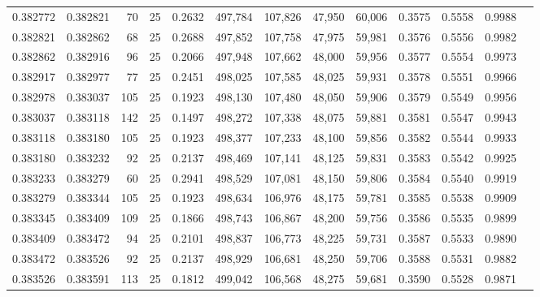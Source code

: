 \begin{tabular}{rrrrrrrrrrrrr}
0.382772 & 0.382821 &    70 &  25 &                                     0.2632 & 497,784 & 107,826 &  47,950 &  60,006 & 0.3575 & 0.5558 & 0.9988 \\
0.382821 & 0.382862 &    68 &  25 &                                     0.2688 & 497,852 & 107,758 &  47,975 &  59,981 & 0.3576 & 0.5556 & 0.9982 \\
0.382862 & 0.382916 &    96 &  25 &                                     0.2066 & 497,948 & 107,662 &  48,000 &  59,956 & 0.3577 & 0.5554 & 0.9973 \\
0.382917 & 0.382977 &    77 &  25 &                                     0.2451 & 498,025 & 107,585 &  48,025 &  59,931 & 0.3578 & 0.5551 & 0.9966 \\
0.382978 & 0.383037 &   105 &  25 &                                     0.1923 & 498,130 & 107,480 &  48,050 &  59,906 & 0.3579 & 0.5549 & 0.9956 \\
0.383037 & 0.383118 &   142 &  25 &                                     0.1497 & 498,272 & 107,338 &  48,075 &  59,881 & 0.3581 & 0.5547 & 0.9943 \\
0.383118 & 0.383180 &   105 &  25 &                                     0.1923 & 498,377 & 107,233 &  48,100 &  59,856 & 0.3582 & 0.5544 & 0.9933 \\
0.383180 & 0.383232 &    92 &  25 &                                     0.2137 & 498,469 & 107,141 &  48,125 &  59,831 & 0.3583 & 0.5542 & 0.9925 \\
0.383233 & 0.383279 &    60 &  25 &                                     0.2941 & 498,529 & 107,081 &  48,150 &  59,806 & 0.3584 & 0.5540 & 0.9919 \\
0.383279 & 0.383344 &   105 &  25 &                                     0.1923 & 498,634 & 106,976 &  48,175 &  59,781 & 0.3585 & 0.5538 & 0.9909 \\
0.383345 & 0.383409 &   109 &  25 &                                     0.1866 & 498,743 & 106,867 &  48,200 &  59,756 & 0.3586 & 0.5535 & 0.9899 \\
0.383409 & 0.383472 &    94 &  25 &                                     0.2101 & 498,837 & 106,773 &  48,225 &  59,731 & 0.3587 & 0.5533 & 0.9890 \\
0.383472 & 0.383526 &    92 &  25 &                                     0.2137 & 498,929 & 106,681 &  48,250 &  59,706 & 0.3588 & 0.5531 & 0.9882 \\
0.383526 & 0.383591 &   113 &  25 &                                     0.1812 & 499,042 & 106,568 &  48,275 &  59,681 & 0.3590 & 0.5528 & 0.9871 \\

\end{tabular}
